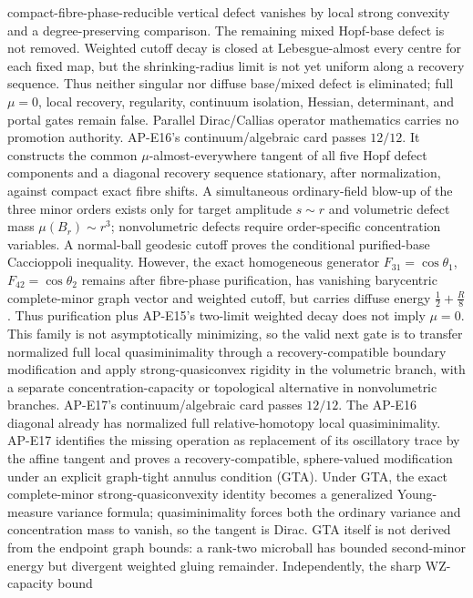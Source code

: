 \documentclass[11pt]{article}
\numberwithin{equation}{section}
\begin{document}
compact-fibre-phase-reducible vertical defect vanishes by local strong
convexity and a degree-preserving comparison.  The remaining mixed Hopf-base
defect is not removed.  Weighted cutoff decay is closed at Lebesgue-almost
every centre for each fixed map, but the shrinking-radius limit is not yet
uniform along a recovery sequence.  Thus neither singular nor diffuse
base/mixed defect is eliminated; full $\mu=0$, local recovery, regularity,
continuum isolation, Hessian, determinant, and portal gates remain false.
Parallel Dirac/Callias operator mathematics carries no promotion authority.
AP-E16's continuum/algebraic card passes $12/12$.  It constructs the common
$\mu$-almost-everywhere tangent of all five Hopf defect components and a
diagonal recovery sequence stationary, after normalization, against compact
exact fibre shifts.  A simultaneous ordinary-field blow-up of the three
minor orders exists only for target amplitude $s\sim r$ and volumetric defect
mass $\mu(B_r)\sim r^3$; nonvolumetric defects require order-specific
concentration variables.  A normal-ball geodesic cutoff proves the
conditional purified-base Caccioppoli inequality.  However, the exact
homogeneous generator
$F_{31}=\cos\theta_1$, $F_{42}=\cos\theta_2$ remains after fibre-phase
purification, has vanishing barycentric complete-minor graph vector and
weighted cutoff, but carries diffuse energy $\frac12+\frac R8$.  Thus
purification plus AP-E15's two-limit weighted decay does not imply
$\mu=0$.  This family is not asymptotically minimizing, so the valid next
gate is to transfer normalized full local quasiminimality through a
recovery-compatible boundary modification and apply strong-quasiconvex
rigidity in the volumetric branch, with a separate concentration-capacity or
topological alternative in nonvolumetric branches.
AP-E17's continuum/algebraic card passes $12/12$.  The AP-E16 diagonal
already has normalized full relative-homotopy local quasiminimality.  AP-E17
identifies the missing operation as replacement of its oscillatory trace by
the affine tangent and proves a recovery-compatible, sphere-valued
modification under an explicit graph-tight annulus condition (GTA).  Under
GTA, the exact complete-minor strong-quasiconvexity identity becomes a
generalized Young-measure variance formula; quasiminimality forces both the
ordinary variance and concentration mass to vanish, so the tangent is Dirac.
GTA itself is not derived from the endpoint graph bounds: a rank-two
microball has bounded second-minor energy but divergent weighted gluing
remainder.  Independently, the sharp WZ-capacity bound
\end{document}
